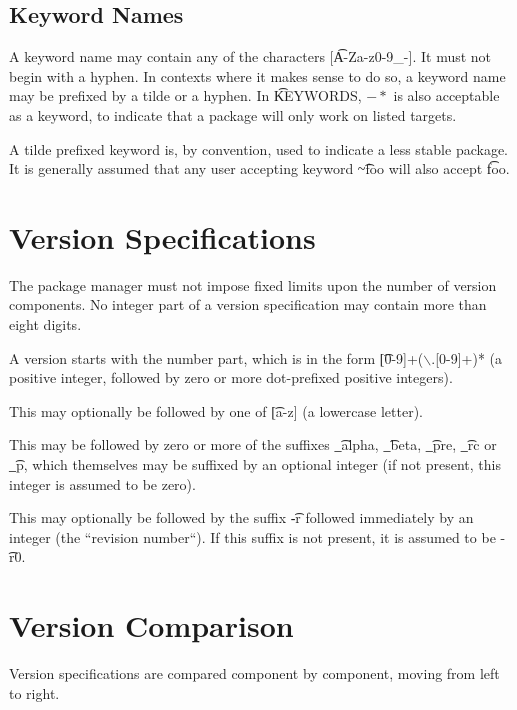 \subsection{Keyword Names}
\label{keyword-names}
A keyword name may contain any of the characters [\t{A-Za-z0-9\_-}]. It must not begin with a
hyphen. In contexts where it makes sense to do so, a keyword name may be prefixed by
a tilde or a hyphen. In \t{KEYWORDS}, $-*$ is also acceptable as a keyword, to indicate that
a package will only work on listed targets.

A tilde prefixed keyword is, by convention, used to indicate a less stable package. It is generally
assumed that any user accepting keyword \t{\textasciitilde{}foo} will also accept \t{foo}.

\section{Version Specifications}
The package manager must not impose fixed limits upon the number of version components. No
integer part of a version specification may contain more than eight digits.

A version starts with the number part, which is in the form \t{[0-9]+($\backslash$.[0-9]+)*} (a positive
integer, followed by zero or more dot-prefixed positive integers).

This may optionally be followed by one of \t{[a-z]} (a lowercase letter).

This may be followed by zero or more of the suffixes \t{\_alpha}, \t{\_beta}, \t{\_pre},
\t{\_rc} or \t{\_p}, which themselves may be suffixed by an optional integer (if not present,
this integer is assumed to be zero).

This may optionally be followed by the suffix \t{-r} followed immediately by an integer (the
``revision number``). If this suffix is not present, it is assumed to be \t{-r0}.


\section{Version Comparison}

Version specifications are compared component by component, moving from left to right.

